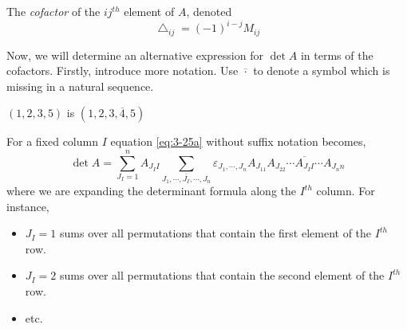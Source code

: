 \documentclass{article}
\numberwithin{equation}{section}
\begin{document}
\begin{defi}[Cofactor]
    The \emph{cofactor} of the $ij^{th}$ element of $A$, denoted
    \begin{equation}\label{eq:3-36}
       \bigtriangleup_{ij} = (-1)^{i - j} M_{ij} 
    \end{equation}
\end{defi}

Now, we will determine an alternative expression for $\det A$ in terms of the cofactors.
Firstly, introduce more notation. Use $\overline{\cdot}$ to denote a symbol which is missing in a natural sequence.
\begin{eg}
    $(1, 2, 3, 5)$ is $(1, 2, 3, \overline{4}, 5)$
\end{eg}

For a fixed column $I$ equation \eqref{eq:3-25a} without suffix notation becomes,
\begin{equation}\label{eq:3-37}
    \det A = \sum_{J_I = 1}^{n} A_{J_II} \sum_{J_1, \cdots, \overline{J_I}, \cdots, J_n} \varepsilon_{J_1, \cdots, J_n} A_{J_11}A_{J_22} \cdots \overline{A_{J_II}} \cdots A_{J_nn}
\end{equation}
where we are expanding the determinant formula along the $I^{th}$ column. For instance,
\begin{itemize}
    \item $J_I = 1$ sums over all permutations that contain the first element of the $I^{th}$ row.
    \item $J_I = 2$ sums over all permutations that contain the second element of the $I^{th}$ row.
    \item etc.
\end{itemize}
\end{document}
